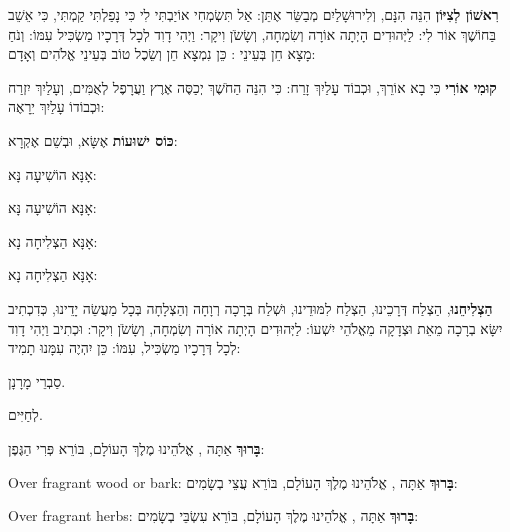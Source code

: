 
\label{havdalah}

\textbf{רִאשׁוֹן לְצִיּוֹן} הִנֵּה הִנָּם, וְלִירוּשָׁלַיִם מְבַשֵּׂר אֶתֵּן: אַל תִּשְׂמְחִי אוֹיַבְתִּי לִי כִּי נָפַלְתִּי קַמְתִּי, כִּי אֵשֵׁב בַּחוֹשֶׁךְ \Shem{} אוֹר לִי: לַיְּהוּדִים הָיְתָה אוֹרָה וְשִׂמְחָה, וְשָׂשֹׂן וִיקָר: וַיְהִי דָוִד לְכָל דְּרָכָיו מַשְׂכִּיל  עִמּוֹ: וְנֹחַ מָצָא חֵן בְּעֵינֵי \Shem{}: כֵּן נִמְצָא חֵן וְשֵׂכֶל טוֹב בְּעֵינֵי אֱלֹהִים וְאָדָם:

\textbf{קוּמִי אוֹרִי} כִּי בָא אוֹרֵךְ, וּכְבוֹד \Shem{} עָלַיִךְ זָרַח: כִּי הִנֵּה הַחֹשֶׁךְ יְכַסֶּה אֶרֶץ וַעֲרָפֶל לְאֻמִּים, וְעָלַיִךְ יִזְרַח \Shem{} וּכְבוֹדוֹ עָלַיִךְ יֵרָאֶה:

\textbf{כּוֹס ישׁוּעוֹת} אֶשָּׂא, וּבְשֵׁם \Shem{} אֶקְרָא:

אָנָּא \Shem{} הוֹשִׁיעָה נָּא:

אָנָּא \Shem{} הוֹשִׁיעָה נָּא:

אָנָּא \Shem{} הַצְלִיחָה נָא:

אָנָּא \Shem{} הַצְלִיחָה נָא:

\textbf{הַצְלִיחֵנוּ}, הַצְלַח דְּרָכֵינוּ, הַצְלַח לִמּוּדֵינוּ, וּשְׁלַח בְּרָכָה רְוָחָה וְהַצְלָחָה בְּכָל מַעֲשֵׂה יָדֵינוּ, כְּדִכְתִיב יִשָּׂא בְרָכָה מֵאֵת \Shem{} וּצְדָקָה מֵאֱלֹהֵי יִשְׁעוֹ: לַיְּהוּדִים הָיְתָה אוֹרָה וְשִׂמְחָה, וְשָׂשֹׂן וִיקָר: וּכְתִיב וַיְהִי דָוִד לְכָל דְּרָכָיו מַשְׂכִּיל,  עִמּוֹ: כֵּן יִהְיֶה עִמָּנוּ תָמִיד:

סַבְרֵי מָרָנָן.

לְחַיִּים.

\textbf{בָּרוּךְ} אַתָּה \Shem{}, אֱלֹהֵינוּ מֶלֶךְ הָעוֹלָם, בּוֹרֵא פְּרִי הַגֶּפֶן:


\begin{seasonal}{Over fragrant wood or bark:}
\textbf{בָּרוּךְ} אַתָּה \Shem{}, אֱלֹהֵינוּ מֶלֶךְ הָעוֹלָם, בּוֹרֵא עֲצֵי בְשָׂמִים:
\end{seasonal}

\begin{seasonal}{Over fragrant herbs:}
\textbf{בָּרוּךְ} אַתָּה \Shem{}, אֱלֹהֵינוּ מֶלֶךְ הָעוֹלָם, בּוֹרֵא עִשְׂבֵּי בְשָׂמִים:
\end{seasonal}

